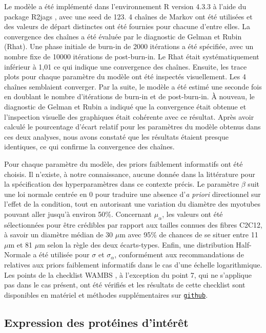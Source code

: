 \documentclass[11pt]{report}
\begin{document}
Le modèle a été implémenté dans l'environnement R version 4.3.3 à l'aide du package R2jags \parencite{su_r2jags_2024}, avec une seed de 123. 4 chaînes de Markov ont été utilisées et des valeurs de départ distinctes ont été fournies pour chacune d'entre elles. La convergence des chaînes a été évaluée par le diagnostic de Gelman et Rubin (Rhat). Une phase initiale de burn-in de 2000 itérations a été spécifiée, avec un nombre fixe de 10000 itérations de post-burn-in. Le Rhat était systématiquement inférieur à 1,01 ce qui indique une convergence des chaînes. Ensuite, les trace plots pour chaque paramètre du modèle ont été inspectés visuellement. Les 4 chaînes semblaient converger. Par la suite, le modèle a été estimé une seconde fois en doublant le nombre d'itérations de burn-in et de post-burn-in. À nouveau, le diagnostic de Gelman et Rubin a indiqué que la convergence était obtenue et l'inspection visuelle des graphiques était cohérente avec ce résultat. Après avoir calculé le pourcentage d'écart relatif pour les paramètres du modèle obtenus dans ces deux analyses, nous avons constaté que les résultats étaient presque identiques, ce qui confirme la convergence des chaînes.

Pour chaque paramètre du modèle, des priors faiblement informatifs ont été choisis. Il n'existe, à notre connaissance, aucune donnée dans la littérature pour la spécification des hyperparamètres dans ce contexte précis. Le paramètre $\beta$ suit une loi normale centrée en 0 pour traduire une absence d'\textit{a priori} directionnel sur l'effet de la condition, tout en autorisant une variation du diamètre des myotubes pouvant aller jusqu'à environ 50\%. Concernant $\mu_{\alpha}$, les valeurs ont été sélectionnées pour être crédibles par rapport aux tailles connues des fibres C2C12, à savoir un diamètre médian de 30 $\mu$m avec 95\% de chances de se situer entre 11 $\mu$m et 81 $\mu$m selon la règle des deux écarts-types. Enfin, une distribution Half-Normale a été utilisée pour $\sigma$ et $\sigma_{\alpha}$, conformément aux recommandations de \textcite{Gelman2020Aug} relatives aux priors faiblement informatifs dans le cas d'une échelle logarithmique. Les points de la checklist WAMBS \parencite{Depaoli2017Jun}, à l'exception du point 7, qui ne s'applique pas dans le cas présent, ont été vérifiés et les résultats de cette checklist sont disponibles en matériel et méthodes supplémentaires sur \href{https://github.com/leoninerouanet/memoire_2A_env_systemique}{\texttt{github}}.

\subsection{Expression des protéines d'intérêt}
\end{document}
